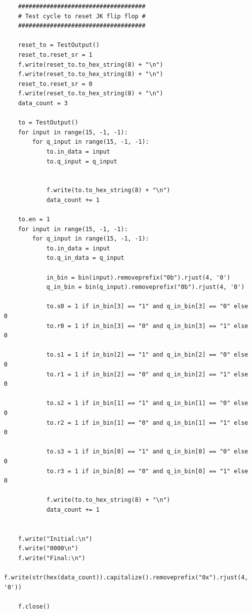 \documentclass[a4paper]{article}
\begin{document}
\begin{verbatim}
    ####################################
    # Test cycle to reset JK flip flop #
    ####################################

    reset_to = TestOutput()
    reset_to.reset_sr = 1
    f.write(reset_to.to_hex_string(8) + "\n")
    f.write(reset_to.to_hex_string(8) + "\n")
    reset_to.reset_sr = 0
    f.write(reset_to.to_hex_string(8) + "\n")
    data_count = 3

    to = TestOutput()
    for input in range(15, -1, -1):
        for q_input in range(15, -1, -1):
            to.in_data = input
            to.q_input = q_input
            

            f.write(to.to_hex_string(8) + "\n")
            data_count += 1

    to.en = 1
    for input in range(15, -1, -1):
        for q_input in range(15, -1, -1):
            to.in_data = input
            to.q_in_data = q_input
            
            in_bin = bin(input).removeprefix("0b").rjust(4, '0')
            q_in_bin = bin(q_input).removeprefix("0b").rjust(4, '0')

            to.s0 = 1 if in_bin[3] == "1" and q_in_bin[3] == "0" else 0
            to.r0 = 1 if in_bin[3] == "0" and q_in_bin[3] == "1" else 0

            to.s1 = 1 if in_bin[2] == "1" and q_in_bin[2] == "0" else 0
            to.r1 = 1 if in_bin[2] == "0" and q_in_bin[2] == "1" else 0

            to.s2 = 1 if in_bin[1] == "1" and q_in_bin[1] == "0" else 0
            to.r2 = 1 if in_bin[1] == "0" and q_in_bin[1] == "1" else 0

            to.s3 = 1 if in_bin[0] == "1" and q_in_bin[0] == "0" else 0
            to.r3 = 1 if in_bin[0] == "0" and q_in_bin[0] == "1" else 0

            f.write(to.to_hex_string(8) + "\n")
            data_count += 1


    f.write("Initial:\n")
    f.write("0000\n")
    f.write("Final:\n")
    f.write(str(hex(data_count)).capitalize().removeprefix("0x").rjust(4, '0'))

    f.close()
\end{verbatim}
\Large
\end{document}
